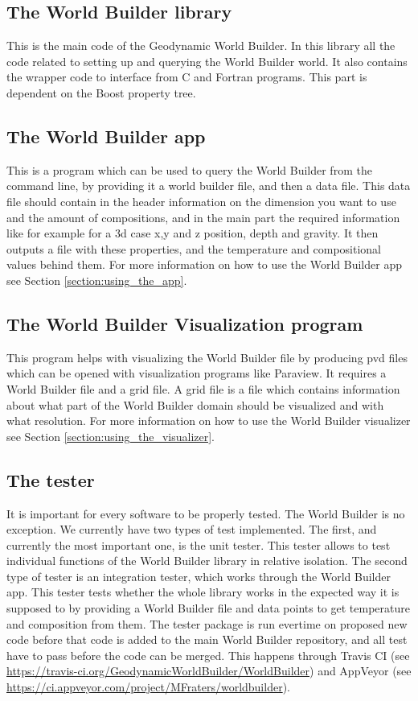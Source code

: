 \documentclass{book}
\newcommand{\GWB}{{Geodynamic World Builder}}
\newcommand{\WB}{{World Builder}}
\newcommand{\paraview}{{Paraview}}
\newcommand{\boost}{{Boost}}
\begin{document}
\subsection{The World Builder library}
This is the main code of the \GWB{}. In this library all the code related to setting up and querying the \WB{} world. It also contains the wrapper code to interface from C and Fortran programs. This part is dependent on the \boost{} property tree. 

\subsection{The World Builder app}
This is a program which can be used to query the \WB{} from the command line, by providing it a world builder file, and then a data file. This data file should contain in the header information on the dimension you want to use and the amount of compositions, and in the main part the required information like for example for a 3d case x,y and z position, depth and gravity. It then outputs a file with these properties, and the temperature and compositional values behind them. For more information on how to use the World Builder app see Section \ref{section:using_the_app}.

\subsection{The World Builder Visualization program}
This program helps with visualizing the \WB{} file by producing pvd files which can be opened with visualization programs like \paraview{}. It requires a \WB{} file and a grid file. A grid file is a file which contains information about what part of the \WB{} domain should be visualized and with what resolution. For more information on how to use the World Builder visualizer see Section \ref{section:using_the_visualizer}.

\subsection{The tester}

It is important for every software to be properly tested. The \WB{} is no exception. We currently have two types of test implemented. The first, and currently the most important one, is the unit tester. This tester allows to test individual functions of the \WB{} library in relative isolation. The second type of tester is an integration tester, which works through the \WB{} app. This tester tests whether the whole library works in the expected way it is supposed to by providing a \WB{} file and data points to get temperature and composition from them. The tester package is run evertime on proposed new code before that code is added to the main \WB{} repository, and all test have to pass before the code can be merged. This happens through Travis CI (see \url{https://travis-ci.org/GeodynamicWorldBuilder/WorldBuilder}) and AppVeyor (see \url{https://ci.appveyor.com/project/MFraters/worldbuilder}).
\end{document}
